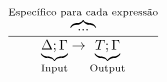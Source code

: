 \begin{figure}[h!]
  \begin{gather*}
    \frac{\overbrace{\text{...}}^{\text{Específico para cada expressão}}}
    {\underbrace{\Delta;\Gamma}_{\text{Input}} \rightarrow
      \underbrace{T;\Gamma}_{\text{Output}}}
  \end{gather*}
  \label{fig:synthesize}
\end{figure}



